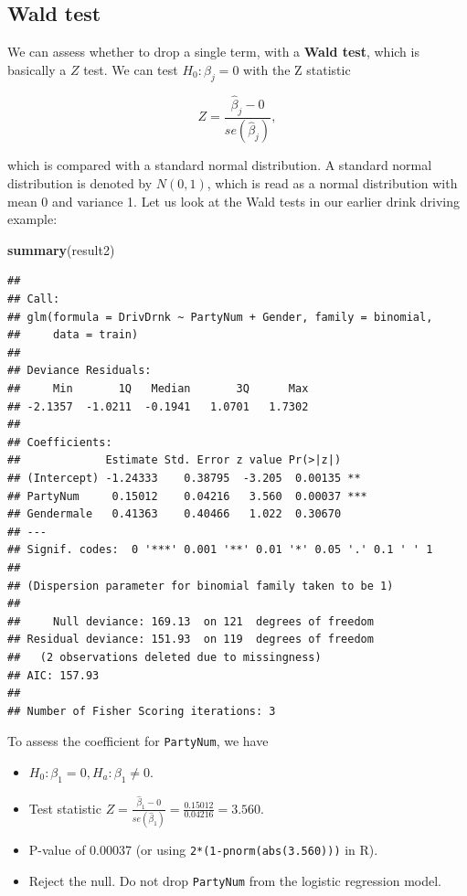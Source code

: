 \documentclass[
]{book}
\newenvironment{Shaded}{\begin{snugshade}}{\end{snugshade}}
\newcommand{\FunctionTok}[1]{\textcolor[rgb]{0.13,0.29,0.53}{\textbf{#1}}}
\newcommand{\NormalTok}[1]{#1}
\providecommand{\tightlist}{%
  \setlength{\itemsep}{0pt}\setlength{\parskip}{0pt}}
\begin{document}
\hypertarget{wald-test}{%
\subsection{Wald test}\label{wald-test}}

We can assess whether to drop a single term, with a \textbf{Wald test}, which is basically a \(Z\) test. We can test \(H_0: \beta_j = 0\) with the Z statistic

\begin{equation} 
Z = \frac{\hat{\beta}_j - 0}{se(\hat{\beta}_j)},
\label{eq:11Z}
\end{equation}

which is compared with a standard normal distribution. A standard normal distribution is denoted by \(N(0,1)\), which is read as a normal distribution with mean 0 and variance 1. Let us look at the Wald tests in our earlier drink driving example:

\begin{Shaded}
\begin{Highlighting}[]
\FunctionTok{summary}\NormalTok{(result2)}
\end{Highlighting}
\end{Shaded}

\begin{verbatim}
## 
## Call:
## glm(formula = DrivDrnk ~ PartyNum + Gender, family = binomial, 
##     data = train)
## 
## Deviance Residuals: 
##     Min       1Q   Median       3Q      Max  
## -2.1357  -1.0211  -0.1941   1.0701   1.7302  
## 
## Coefficients:
##             Estimate Std. Error z value Pr(>|z|)    
## (Intercept) -1.24333    0.38795  -3.205  0.00135 ** 
## PartyNum     0.15012    0.04216   3.560  0.00037 ***
## Gendermale   0.41363    0.40466   1.022  0.30670    
## ---
## Signif. codes:  0 '***' 0.001 '**' 0.01 '*' 0.05 '.' 0.1 ' ' 1
## 
## (Dispersion parameter for binomial family taken to be 1)
## 
##     Null deviance: 169.13  on 121  degrees of freedom
## Residual deviance: 151.93  on 119  degrees of freedom
##   (2 observations deleted due to missingness)
## AIC: 157.93
## 
## Number of Fisher Scoring iterations: 3
\end{verbatim}

To assess the coefficient for \texttt{PartyNum}, we have

\begin{itemize}
\tightlist
\item
  \(H_0: \beta_1 = 0, H_a: \beta_1 \neq 0\).
\item
  Test statistic \(Z = \frac{\hat{\beta}_1 - 0}{se(\hat{\beta}_1)} = \frac{0.15012}{0.04216} = 3.560\).
\item
  P-value of 0.00037 (or using \texttt{2*(1-pnorm(abs(3.560)))} in R).
\item
  Reject the null. Do not drop \texttt{PartyNum} from the logistic regression model.
\end{itemize}
\end{document}
